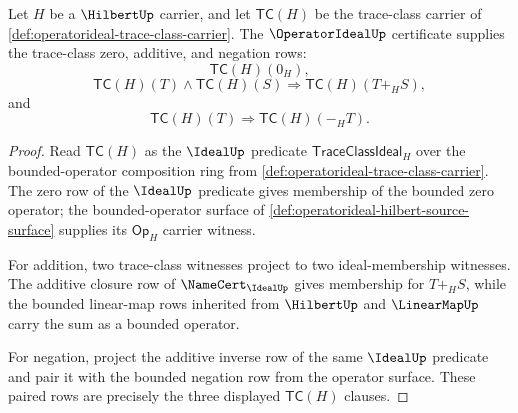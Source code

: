 \begin{theorem}
\label{thm:operatorideal-additive-closure-row}
Let $H$ be a $\HilbertUp$ carrier, and let $\mathsf{TC}(H)$ be the trace-class carrier of \autoref{def:operatorideal-trace-class-carrier}. The $\OperatorIdealUp$ certificate supplies the trace-class zero, additive, and negation rows:
$$
\mathsf{TC}(H)(0_H),
$$
$$
\mathsf{TC}(H)(T)\land\mathsf{TC}(H)(S)\Longrightarrow \mathsf{TC}(H)(T+_H S),
$$
and
$$
\mathsf{TC}(H)(T)\Longrightarrow \mathsf{TC}(H)(-_H T).
$$
\end{theorem}
\begin{proof}
Read $\mathsf{TC}(H)$ as the $\IdealUp$ predicate $\mathsf{TraceClassIdeal}_H$ over the bounded-operator composition ring from \autoref{def:operatorideal-trace-class-carrier}. The zero row of the $\IdealUp$ predicate gives membership of the bounded zero operator; the bounded-operator surface of \autoref{def:operatorideal-hilbert-source-surface} supplies its $\mathsf{Op}_H$ carrier witness.

For addition, two trace-class witnesses project to two ideal-membership witnesses. The additive closure row of $\NameCert_{\IdealUp}$ gives membership for $T+_H S$, while the bounded linear-map rows inherited from $\HilbertUp$ and $\LinearMapUp$ carry the sum as a bounded operator.

For negation, project the additive inverse row of the same $\IdealUp$ predicate and pair it with the bounded negation row from the operator surface. These paired rows are precisely the three displayed $\mathsf{TC}(H)$ clauses.
\end{proof}

